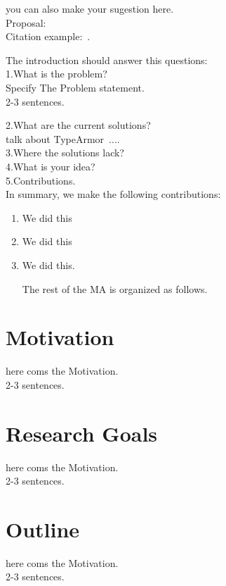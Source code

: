 you can also make your sugestion here. \\ 

Proposal: \\ 

Citation example:~\cite{latex}. 

The introduction should answer this questions:
\\

1.What is the problem? 
\\

Specify The Problem statement. 
\\
2-3 sentences.

2.What are the current solutions?
\\
talk about TypeArmor~\cite{veen:typearmor}....\\

3.Where the solutions lack?
\\

4.What is your idea?
\\

5.Contributions.
\\

In summary, we make the following contributions:

\begin{enumerate}
 \item We did this 
 
 \item We did this 
 
 \item We did this.
 
 The rest of the MA is organized as follows.
 
\end{enumerate}

\section{Motivation}
here coms the Motivation.
\\
2-3 sentences.

\section{Research Goals}
here coms the Motivation.
\\
2-3 sentences.

\section{Outline}
here coms the Motivation.
\\
2-3 sentences.

